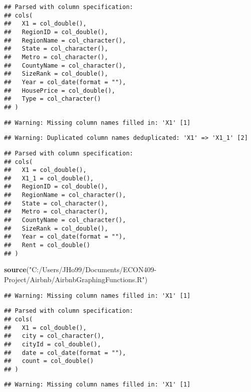\documentclass[
]{article}
\newenvironment{Shaded}{\begin{snugshade}}{\end{snugshade}}
\newcommand{\KeywordTok}[1]{\textcolor[rgb]{0.13,0.29,0.53}{\textbf{#1}}}
\newcommand{\NormalTok}[1]{#1}
\newcommand{\StringTok}[1]{\textcolor[rgb]{0.31,0.60,0.02}{#1}}
\begin{document}
\begin{verbatim}
## Parsed with column specification:
## cols(
##   X1 = col_double(),
##   RegionID = col_double(),
##   RegionName = col_character(),
##   State = col_character(),
##   Metro = col_character(),
##   CountyName = col_character(),
##   SizeRank = col_double(),
##   Year = col_date(format = ""),
##   HousePrice = col_double(),
##   Type = col_character()
## )
\end{verbatim}

\begin{verbatim}
## Warning: Missing column names filled in: 'X1' [1]
\end{verbatim}

\begin{verbatim}
## Warning: Duplicated column names deduplicated: 'X1' => 'X1_1' [2]
\end{verbatim}

\begin{verbatim}
## Parsed with column specification:
## cols(
##   X1 = col_double(),
##   X1_1 = col_double(),
##   RegionID = col_double(),
##   RegionName = col_character(),
##   State = col_character(),
##   Metro = col_character(),
##   CountyName = col_character(),
##   SizeRank = col_double(),
##   Year = col_date(format = ""),
##   Rent = col_double()
## )
\end{verbatim}

\begin{Shaded}
\begin{Highlighting}[]
\KeywordTok{source}\NormalTok{(}\StringTok{"C:/Users/JHo99/Documents/ECON409-Project/Airbnb/AirbnbGraphingFunctions.R"}\NormalTok{)}
\end{Highlighting}
\end{Shaded}

\begin{verbatim}
## Warning: Missing column names filled in: 'X1' [1]
\end{verbatim}

\begin{verbatim}
## Parsed with column specification:
## cols(
##   X1 = col_double(),
##   city = col_character(),
##   cityId = col_double(),
##   date = col_date(format = ""),
##   count = col_double()
## )
\end{verbatim}

\begin{verbatim}
## Warning: Missing column names filled in: 'X1' [1]
\end{verbatim}
\end{document}
